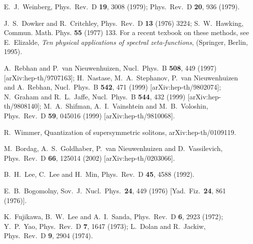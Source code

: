 \documentclass[a4paper,12pt]{article}
\begin{document}
\begin{thebibliography}{99}
E.~J.~Weinberg,
Phys.\ Rev.\ D {\bf 19}, 3008 (1979);
Phys.\ Rev.\ D {\bf 20}, 936 (1979).

J.~S.~Dowker and R.~Critchley,
Phys.\ Rev.\ D {\bf 13} (1976) 3224;
S.~W.~Hawking, Commun. Math. Phys. {\bf 55} (1977) 133.
For a recent texbook on these methods, see
E.~Elizalde, {\it Ten physical applications of spectral zeta-functions},
(Springer, Berlin, 1995).

A.~Rebhan and P.~van Nieuwenhuizen,
Nucl.\ Phys.\ B {\bf 508}, 449 (1997)
[arXiv:hep-th/9707163];
H.~Nastase, M.~A.~Stephanov, P.~van Nieuwenhuizen and A.~Rebhan,
Nucl.\ Phys.\ B {\bf 542}, 471 (1999)
[arXiv:hep-th/9802074];
N.~Graham and R.~L.~Jaffe,
Nucl.\ Phys.\ B {\bf 544}, 432 (1999)
[arXiv:hep-th/9808140];
M.~A.~Shifman, A.~I.~Vainshtein and M.~B.~Voloshin,
Phys.\ Rev.\ D {\bf 59}, 045016 (1999)
[arXiv:hep-th/9810068].

R.~Wimmer,
Quantization of supersymmetric solitons,
arXiv:hep-th/0109119.

M.~Bordag, A.~S.~Goldhaber, P.~van Nieuwenhuizen and D.~Vassilevich,
Phys.\ Rev.\ D {\bf 66}, 125014 (2002)
[arXiv:hep-th/0203066].

B.~H.~Lee, C.~Lee and H.~Min,
Phys.\ Rev.\ D {\bf 45}, 4588 (1992).

E.~B.~Bogomolny,
Sov.\ J.\ Nucl.\ Phys.\  {\bf 24}, 449 (1976)
[Yad.\ Fiz.\  {\bf 24}, 861 (1976)].

K.~Fujikawa, B.~W.~Lee and A.~I.~Sanda,
Phys.\ Rev.\ D {\bf 6}, 2923 (1972);
Y.~P.~Yao,
Phys.\ Rev.\ D {\bf 7}, 1647 (1973);
L.~Dolan and R.~Jackiw,
Phys.\ Rev.\ D {\bf 9}, 2904 (1974).


\end{thebibliography}
\end{document}
